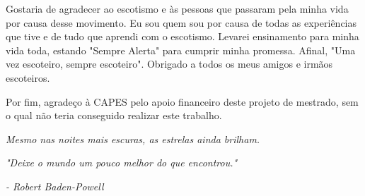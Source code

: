 Gostaria de agradecer ao escotismo e às pessoas que passaram pela minha vida por causa desse movimento. Eu sou quem sou por causa de todas as experiências que tive e de tudo que aprendi com o escotismo. Levarei ensinamento para minha vida toda, estando "Sempre Alerta" para cumprir minha promessa. Afinal, "Uma vez escoteiro, sempre escoteiro". Obrigado a todos os meus amigos e irmãos escoteiros.

Por fim, agradeço à CAPES pelo apoio financeiro deste projeto de mestrado, sem o qual não teria conseguido realizar este trabalho.



\cleardoublepage %
\null
\vfill
\hfill%
\begin{minipage}{.65\linewidth}
    \textit{Mesmo nas noites mais escuras, as estrelas ainda brilham.}

    \vspace{2cm} %

    \hfill
    \textit{"Deixe o mundo um pouco melhor do que encontrou."}
    
    \hfill
    \textit{- Robert Baden-Powell}

\end{minipage}



